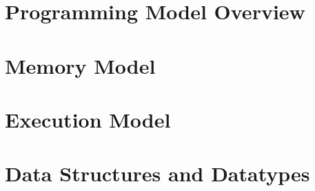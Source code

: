 \documentclass[10pt]{book}
\begin{document}





%

\section{Programming Model Overview}\label{subsec:programming_model}


\section{Memory Model}\label{subsec:memory_model}


\section{Execution Model}\label{subsec:execution_model}


\section{Data Structures and Datatypes}\label{subsec:data_structs}


%

%

%




\clearpage
\end{document}
